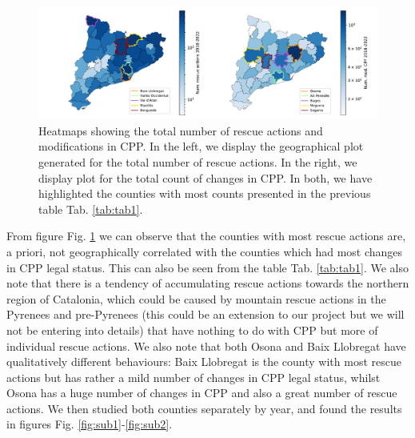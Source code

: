 \documentclass[
  journal=small,
  manuscript=mini-article,  %
  year=2023,
  volume=1,
]{odj-journal}
\begin{document}
\begin{figure}[hbt!]
\centering
\includegraphics[width=1\linewidth]{../figures/merged_maps_plot}
\caption{Heatmaps showing the total number of rescue actions and modifications in CPP. In the left, we display the geographical plot generated for the total number of rescue actions. In the right, we display plot for the total count of changes in CPP. In both, we have highlighted the counties with most counts presented in the previous table Tab. \ref{tab:tab1}.}
\label{fig:fig1}
\end{figure}
From figure Fig. \ref{fig:fig1} we can observe that the counties with most rescue actions are, a priori, not geographically correlated with the counties which had most changes in CPP legal status. This can also be seen from the table Tab. \ref{tab:tab1}. We also note that there is a tendency of accumulating rescue actions towards the northern region of Catalonia, which could be caused by mountain rescue actions in the Pyrenees and pre-Pyrenees (this could be an extension to our project but we will not be entering into details) that have nothing to do with CPP but more of individual rescue actions. We also note that both Osona and Baix Llobregat have qualitatively different behaviours: Baix Llobregat is the county with most rescue actions but has rather a mild number of changes in CPP legal status, whilst Osona has a huge number of changes in CPP and also a great number of rescue actions. We then studied both counties separately by year, and found the results in figures Fig. \ref{fig:sub1}-\ref{fig:sub2}.
\end{document}
